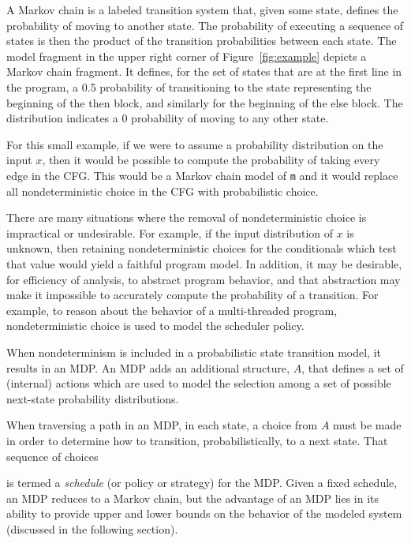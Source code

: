 A Markov chain is a labeled transition system that, given some
state, defines the probability of moving to another state.
The probability of executing a sequence of states is then the
product of the transition probabilities between each state.
The model fragment in the upper right corner of 
Figure~\ref{fig:example} depicts a Markov chain fragment.
It defines, for the set of states 
that are at the first line in the program, 
a 0.5 probability of transitioning to 
the state representing the beginning of the then block,
and similarly for the beginning of the else block.  The
distribution indicates a 0 probability of moving to any
other state.

For this small example, if we were to assume a probability
distribution on the input $x$, then it would be possible
to compute the probability of taking every edge in the CFG.   
This would be a Markov chain model of {\tt m} and it would replace
all nondeterministic choice in the CFG with probabilistic choice.

There are many situations where the removal of nondeterministic
choice is impractical or undesirable.  For example, if the input
distribution of $x$ is unknown, then retaining nondeterministic
choices for the conditionals which test that value would yield a
faithful program model.  In addition, it may be desirable, for
efficiency of analysis, to abstract program behavior, and that
abstraction may make it impossible to accurately compute the 
probability of a transition.  For example, to reason about the
behavior of a multi-threaded program, nondeterministic choice is
used to model the scheduler policy.

When nondeterminism is included in a probabilistic state
transition model, it results in an MDP.  
An MDP adds an additional structure, $A$, that defines
a set of (internal) actions which are used to model the
selection among a set of possible next-state probability distributions.
When traversing a path in an MDP, in each state, a choice
from $A$ must be made in order to determine how to transition,
probabilistically, to a next state.   That sequence of choices
 is termed a \textit{schedule} (or policy or 
strategy) for the MDP.
Given a fixed schedule, an MDP reduces to a Markov chain, but
the advantage of an MDP lies in its ability to provide upper and
lower bounds on the behavior of the modeled system (discussed
in the following section).
